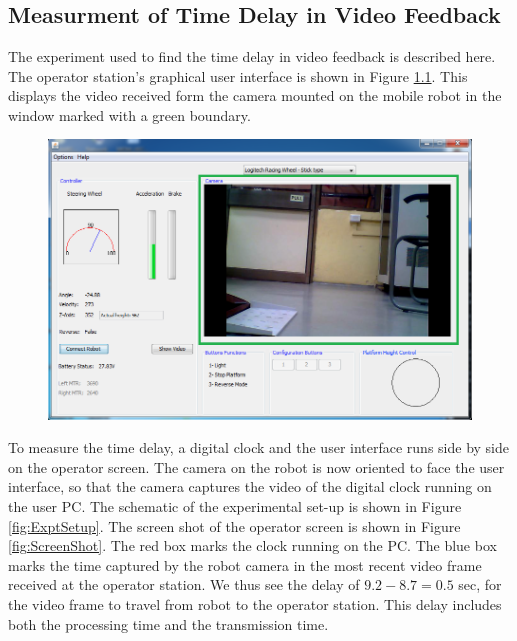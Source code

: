 \chapter{ }
\section{Measurment of Time Delay in Video Feedback}
\label{app:DH}
The experiment used to find the time delay in video feedback is described here. The operator station's graphical user interface is shown in Figure \ref{fig:Gui2}. This displays the video received form the camera mounted on the mobile robot  in the window marked with a green boundary.   
\begin{figure}
	\includegraphics[width=\linewidth,keepaspectratio]{Chapter5/fig/gui1}
	\label{fig:Gui2} 
\end{figure}

To measure the time delay, a digital clock and the user interface runs side by side on the operator screen. The camera on the robot is now oriented to face the user interface, so that the camera captures the video of the digital clock running on the user PC. The schematic of the experimental set-up is shown in Figure \ref{fig:ExptSetup}. The screen shot of the operator screen is shown in Figure \ref{fig:ScreenShot}. The red box marks the clock running on the PC. The blue box marks the time captured by the robot camera in the most recent video frame received at the operator station. We thus see the delay  of $9.2-8.7=0.5$ sec, for the video frame to travel from robot to the operator station. This delay includes both the processing time and the transmission time.

